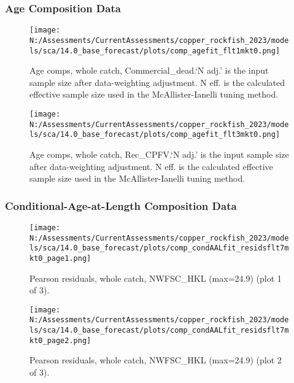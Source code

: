 \documentclass[11pt,
  english,
  letterpaper,
]{article}
\begin{document}
\newpage

\hypertarget{age-data}{%
\subsubsection{Age Composition Data}\label{age-data}}

\begin{figure}
\centering
\texttt{[image: N:/Assessments/CurrentAssessments/copper\_rockfish\_2023/models/sca/14.0\_base\_forecast/plots/comp\_agefit\_flt1mkt0.png]}
\caption{Age comps, whole catch, Commercial\_dead.`N adj.' is the input sample size after data-weighting adjustment. N eff. is the calculated effective sample size used in the McAllister-Ianelli tuning method.\label{fig:comp_agefit_flt1mkt0}}
\end{figure}

\begin{figure}
\centering
\texttt{[image: N:/Assessments/CurrentAssessments/copper\_rockfish\_2023/models/sca/14.0\_base\_forecast/plots/comp\_agefit\_flt3mkt0.png]}
\caption{Age comps, whole catch, Rec\_CPFV.`N adj.' is the input sample size after data-weighting adjustment. N eff. is the calculated effective sample size used in the McAllister-Ianelli tuning method.\label{fig:comp_agefit_flt3mkt0}}
\end{figure}

\newpage

\hypertarget{caal-data}{%
\subsubsection{Conditional-Age-at-Length Composition Data}\label{caal-data}}

\begin{figure}
\centering
\texttt{[image: N:/Assessments/CurrentAssessments/copper\_rockfish\_2023/models/sca/14.0\_base\_forecast/plots/comp\_condAALfit\_residsflt7mkt0\_page1.png]}
\caption{Pearson residuals, whole catch, NWFSC\_HKL (max=24.9) (plot 1 of 3).\label{fig:comp_condAALfit_residsflt7mkt0_page1}}
\end{figure}

\begin{figure}
\centering
\texttt{[image: N:/Assessments/CurrentAssessments/copper\_rockfish\_2023/models/sca/14.0\_base\_forecast/plots/comp\_condAALfit\_residsflt7mkt0\_page2.png]}
\caption{Pearson residuals, whole catch, NWFSC\_HKL (max=24.9) (plot 2 of 3).\label{fig:comp_condAALfit_residsflt7mkt0_page2}}
\end{figure}
\end{document}
